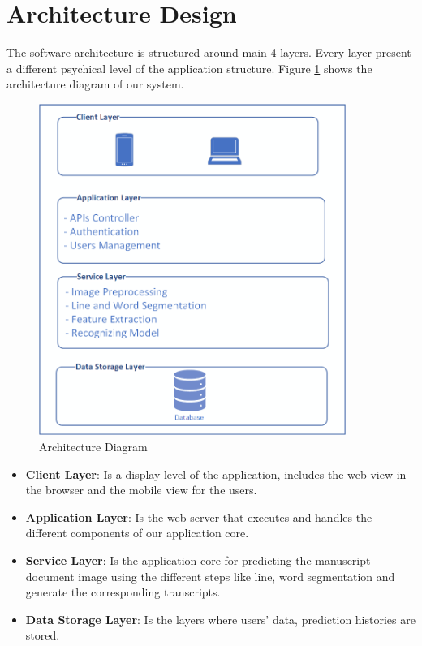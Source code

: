 \pagebreak

\section{Architecture Design}
The software architecture is structured around main 4 layers. Every layer present a different psychical level of the application structure. Figure \ref{fig:architecture-diagram} shows the architecture diagram of our system.

\begin{figure}[!htb]
    \centering
    \includegraphics[width=10cm]{images/architecture layers.png}
    \caption{Architecture Diagram}
    \label{fig:architecture-diagram}
\end{figure}

\begin{itemize}[itemsep=1pt, topsep=5pt]
    \item   \textbf{Client Layer}: Is a display level of the application, includes the web view in the browser and the mobile view for the users.
    \item   \textbf{Application Layer}: Is the web server that executes and handles the different components of our application core. 
    \item   \textbf{Service Layer}: Is the application core for predicting the manuscript document image using the different steps like line, word segmentation and generate the corresponding transcripts.
    \item   \textbf{Data Storage Layer}: Is the layers where users' data, prediction histories are stored. 
\end{itemize}
